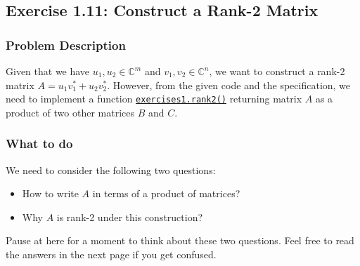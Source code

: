 \subsection*{Exercise 1.11: Construct a Rank-2 Matrix}%
\subsubsection*{Problem Description}
Given that we have $u_1, u_2 \in \mathbb{C}^{m}$ and $v_1, v_2 \in \mathbb{C}^{n}$, we want to construct a rank-2 matrix $A = u_1v_1^{*} + u_2v_2^{*}$. However, from the given code and the specification, we need to implement a function \href{https://comp-lin-alg.github.io/cla_utils.html#cla_utils.exercises1.rank2}{\texttt{exercises1.rank2()}} returning matrix  $A$ as a product of two other matrices $B$ and $C$.
\subsubsection*{What to do}
We need to consider the following two questions:
\begin{itemize}
  \item How to write $A$ in terms of a product of matrices?
  \item Why $A$ is rank-2 under this construction?
\end{itemize}
Pause at here for a moment to think about these two questions. Feel free to read the answers in the next page if you get confused.
\newpage

